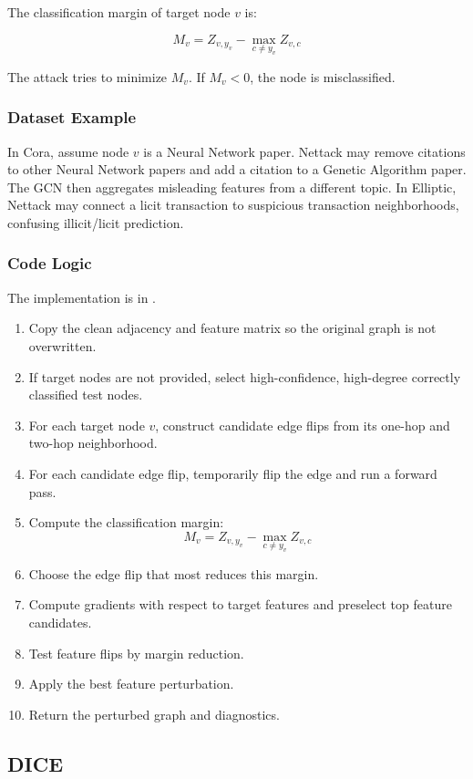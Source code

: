 \documentclass[12pt,a4paper]{article}
\begin{document}
The classification margin of target node $v$ is:

$$
M_v=Z_{v,y_v}-\max_{c\neq y_v}Z_{v,c}
$$

The attack tries to minimize $M_v$. If $M_v<0$, the node is misclassified.

\subsubsection{Dataset Example}
In Cora, assume node $v$ is a Neural Network paper. Nettack may remove citations to other Neural Network papers and add a citation to a Genetic Algorithm paper. The GCN then aggregates misleading features from a different topic. In Elliptic, Nettack may connect a licit transaction to suspicious transaction neighborhoods, confusing illicit/licit prediction.

\subsubsection{Code Logic}
The implementation is in .

\begin{enumerate}
    \item Copy the clean adjacency and feature matrix so the original graph is not overwritten.
    \item If target nodes are not provided, select high-confidence, high-degree correctly classified test nodes.
    \item For each target node $v$, construct candidate edge flips from its one-hop and two-hop neighborhood.
    \item For each candidate edge flip, temporarily flip the edge and run a forward pass.
    \item Compute the classification margin:
    $$
    M_v=Z_{v,y_v}-\max_{c\neq y_v}Z_{v,c}
    $$
    \item Choose the edge flip that most reduces this margin.
    \item Compute gradients with respect to target features and preselect top feature candidates.
    \item Test feature flips by margin reduction.
    \item Apply the best feature perturbation.
    \item Return the perturbed graph and diagnostics.
\end{enumerate}

\subsection{DICE}
\end{document}
